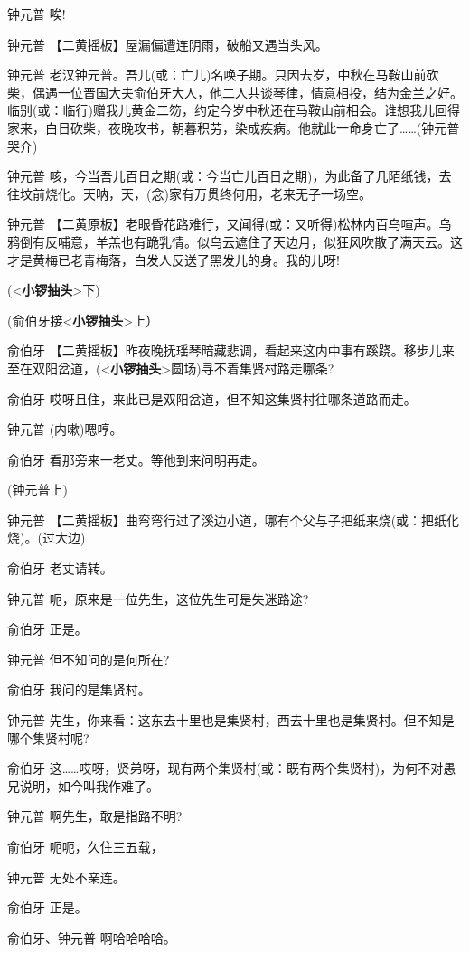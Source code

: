 钟元普 唉!

钟元普 【二黄摇板】屋漏偏遭连阴雨，破船又遇当头风。

钟元普
老汉钟元普。吾儿(或：亡儿)名唤子期。只因去岁，中秋在马鞍山前砍柴，偶遇一位晋国大夫俞伯牙大人，他二人共谈琴律，情意相投，结为金兰之好。临别(或：临行)赠我儿黄金二笏，约定今岁中秋还在马鞍山前相会。谁想我儿回得家来，白日砍柴，夜晚攻书，朝暮积劳，染成疾病。他就此一命身亡了\ldots{}\ldots{}(钟元普哭介)

钟元普
咳，今当吾儿百日之期(或：今当亡儿百日之期)，为此备了几陌纸钱，去往坟前烧化。天呐，天，(念)家有万贯终何用，老来无子一场空。

钟元普
【二黄原板】老眼昏花路难行，又闻得(或：又听得)松林内百鸟喧声。乌鸦倒有反哺意，羊羔也有跪乳情。似乌云遮住了天边月，似狂风吹散了满天云。这才是黄梅已老青梅落，白发人反送了黑发儿的身。我的儿呀!

(\textless{}\textbf{小锣抽头}\textgreater{}下)

(俞伯牙接\textless{}\textbf{小锣抽头}\textgreater{}上）

俞伯牙
【二黄摇板】昨夜晚抚瑶琴暗藏悲调，看起来这内中事有蹊跷。移步儿来至在双阳岔道，(\textless{}\textbf{小锣抽头}\textgreater{}圆场)寻不着集贤村路走哪条?

俞伯牙 哎呀且住，来此已是双阳岔道，但不知这集贤村往哪条道路而走。

钟元普 (内嗽)嗯哼。

俞伯牙 看那旁来一老丈。等他到来问明再走。

(钟元普上)

钟元普
【二黄摇板】曲弯弯行过了溪边小道，哪有个父与子把纸来烧(或：把纸化烧)。(过大边)

俞伯牙 老丈请转。

钟元普 呃，原来是一位先生，这位先生可是失迷路途?

俞伯牙 正是。

钟元普 但不知问的是何所在?

俞伯牙 我问的是集贤村。

钟元普
先生，你来看：这东去十里也是集贤村，西去十里也是集贤村。但不知是哪个集贤村呢?

俞伯牙
这\ldots{}\ldots{}哎呀，贤弟呀，现有两个集贤村(或：既有两个集贤村)，为何不对愚兄说明，如今叫我作难了。

钟元普 啊先生，敢是指路不明?

俞伯牙 呃呃，久住三五载，

钟元普 无处不亲连。

俞伯牙 正是。

俞伯牙、钟元普 啊哈哈哈哈。

